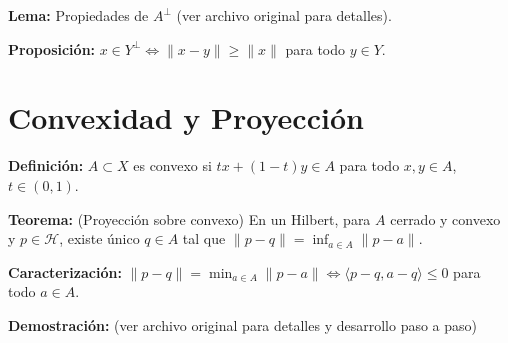 \documentclass{article}
\begin{document}
\textbf{Lema:} Propiedades de $A^\perp$ (ver archivo original para detalles).

\textbf{Proposición:} $x \in Y^\perp \iff \|x-y\| \geq \|x\|$ para todo $y \in Y$.

\section*{Convexidad y Proyección}

\textbf{Definición:} $A \subset X$ es convexo si $tx + (1-t)y \in A$ para todo $x, y \in A$, $t \in (0,1)$.

\textbf{Teorema:} (Proyección sobre convexo) En un Hilbert, para $A$ cerrado y convexo y $p \in \mathcal{H}$, existe único $q \in A$ tal que $\|p-q\| = \inf_{a \in A} \|p-a\|$.

\textbf{Caracterización:} $\|p-q\| = \min_{a \in A} \|p-a\| \iff \langle p-q, a-q \rangle \leq 0$ para todo $a \in A$.

\textbf{Demostración:} (ver archivo original para detalles y desarrollo paso a paso)
\end{document}
